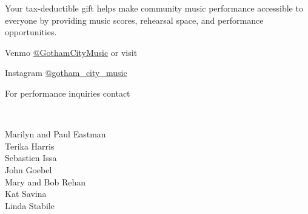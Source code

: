 \documentclass{article}[10pt]
\begin{document}
\begin{center}
\begin{minipage}{4in}
            \begin{center}
            {\textbf{}}
            \end{center}

            \vspace{-0.1in}

            \begin{small}
                Your tax-deductible gift helps make community music performance accessible to everyone by providing music scores, rehearsal space, and performance opportunities.\\
            \end{small}


            Venmo \href{https://account.venmo.com/u/GothamCityMusic}{@GothamCityMusic} or visit \textbf{}

            \begin{center}
            {\textbf{}}

                \faInstagram{}{}  Instagram  \href{https://www.instagram.com/gotham_city_music/}{@gotham\_city\_music}

                For performance inquiries contact
                    {\textbf{}}
            \end{center}

            \begin{center}
            {\textbf{}}
                \\

                \begin{small}
                    \vspace{-0.11in}
                    \begin{multicols*}{2}
                        Marilyn and Paul Eastman\\
                        Terika Harris\\
                        Sebastien Issa\\
                        John Goebel\\
                        Mary and Bob Rehan\\
                        Kat Savina\\
                        Linda Stabile
                    \end{multicols*}
                \end{small}
            \end{center}

        \end{minipage}

    \end{center}
\end{document}
